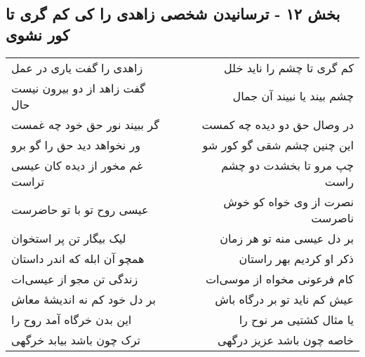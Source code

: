 \begin{center}
\section*{بخش ۱۲ - ترسانیدن شخصی زاهدی را کی کم گری تا کور نشوی}
\label{sec:sh012}
\begin{longtable}{l p{0.5cm} r}
زاهدی را گفت یاری در عمل
&&
کم گری تا چشم را ناید خلل
\\
گفت زاهد از دو بیرون نیست حال
&&
چشم بیند یا نبیند آن جمال
\\
گر ببیند نور حق خود چه غمست
&&
در وصال حق دو دیده چه کمست
\\
ور نخواهد دید حق را گو برو
&&
این چنین چشم شقی گو کور شو
\\
غم مخور از دیده کان عیسی تراست
&&
چپ مرو تا بخشدت دو چشم راست
\\
عیسی روح تو با تو حاضرست
&&
نصرت از وی خواه کو خوش ناصرست
\\
لیک بیگار تن پر استخوان
&&
بر دل عیسی منه تو هر زمان
\\
همچو آن ابله که اندر داستان
&&
ذکر او کردیم بهر راستان
\\
زندگی تن مجو از عیسی‌ات
&&
کام فرعونی مخواه از موسی‌ات
\\
بر دل خود کم نه اندیشهٔ معاش
&&
عیش کم ناید تو بر درگاه باش
\\
این بدن خرگاه آمد روح را
&&
یا مثال کشتیی مر نوح را
\\
ترک چون باشد بیابد خرگهی
&&
خاصه چون باشد عزیز درگهی
\\
\end{longtable}
\end{center}
